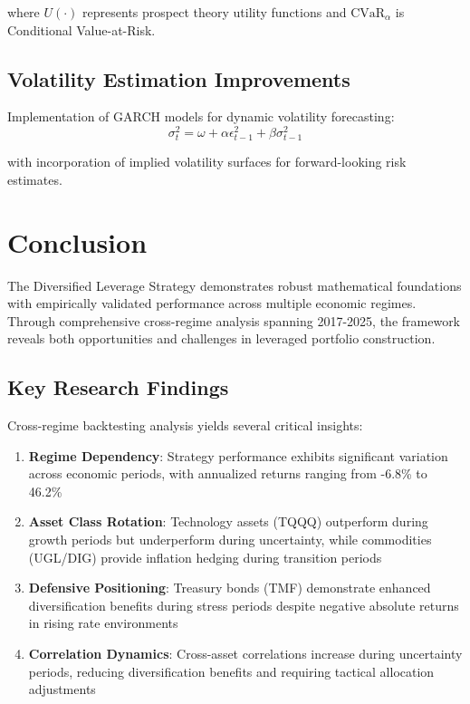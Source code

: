 \documentclass[onecolumn,11pt]{IEEEtran}
\begin{document}
where $U(\cdot)$ represents prospect theory utility functions and $\text{CVaR}_\alpha$ is Conditional Value-at-Risk.

\subsection{Volatility Estimation Improvements}

Implementation of GARCH models for dynamic volatility forecasting:
\begin{equation}
\sigma_t^2 = \omega + \alpha \epsilon_{t-1}^2 + \beta \sigma_{t-1}^2
\end{equation}

with incorporation of implied volatility surfaces for forward-looking risk estimates.

\section{Conclusion}

The Diversified Leverage Strategy demonstrates robust mathematical foundations with empirically validated performance across multiple economic regimes. Through comprehensive cross-regime analysis spanning 2017-2025, the framework reveals both opportunities and challenges in leveraged portfolio construction.

\subsection{Key Research Findings}

Cross-regime backtesting analysis yields several critical insights:

\begin{enumerate}
    \item \textbf{Regime Dependency}: Strategy performance exhibits significant variation across economic periods, with annualized returns ranging from -6.8\% to 46.2\%
    \item \textbf{Asset Class Rotation}: Technology assets (TQQQ) outperform during growth periods but underperform during uncertainty, while commodities (UGL/DIG) provide inflation hedging during transition periods
    \item \textbf{Defensive Positioning}: Treasury bonds (TMF) demonstrate enhanced diversification benefits during stress periods despite negative absolute returns in rising rate environments
    \item \textbf{Correlation Dynamics}: Cross-asset correlations increase during uncertainty periods, reducing diversification benefits and requiring tactical allocation adjustments
\end{enumerate}
\end{document}
